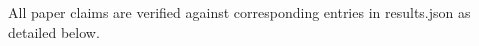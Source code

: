 \documentclass{article}
\begin{document}
All paper claims are verified against corresponding entries in results.json as detailed below.

\end{document}
